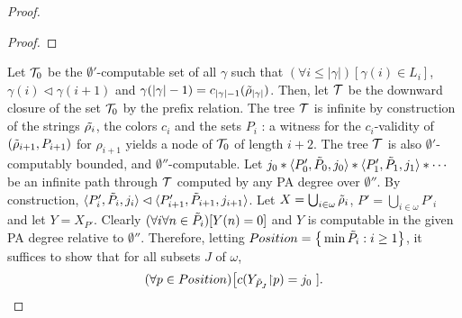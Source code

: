 \begin{proof}
\begin{proof}
\end{proof}

Let $\mathcal{T}_0$ be the $\emptyset'$-computable set of all $\gamma$ such that
$(\forall i\leq |\gamma|)[\gamma(i)\in L_i]$,
$\gamma(i) \lhd \gamma(i+1)$ and $\gamma(|\gamma|-1) = c_{|\gamma|-1}(\tilde{\rho}_{|\gamma|})$.
Then, let $\mathcal{T}$ be the downward closure of the set $\mathcal{T}_0$
by the prefix relation. The tree $\mathcal{T}$ is infinite by construction of the strings $\tilde{\rho_i}$, the colors $c_i$ and the sets $P_i$ : a witness for the $c_i$-validity of $(\tilde{\rho}_{i+1}, P_{i+1})$ for $\rho_{i+1}$ yields a node of $\mathcal{T}_0$ of length $i+2$. The tree $\mathcal{T}$ is also $\emptyset'$-computably bounded, and $\emptyset''$-computable.
Let $j_0*\langle P'_0,\tilde{P}_0,j_0\rangle *\langle P'_1,\tilde{P}_1,j_1\rangle *\cdots$
be an infinite path through $\mathcal{T}$ computed by any PA degree over $\emptyset''$.
By construction, $\langle P'_i,\tilde{P}_i,j_i\rangle \lhd \langle P'_{i+1},\tilde{P}_{i+1},j_{i+1} \rangle$.
Let $X = \bigcup_{i\in\omega}\tilde{\rho}_i$,
$P' = \bigcup_{i\in\omega} P'_i$
and let $Y = X_{P'}$.
Clearly  $(\forall i \forall n\in \tilde{P}_i)[Y(n) = 0]$
and $Y$ is computable in the given PA degree relative to $\emptyset''$.
Therefore,
letting $Position = \big\{\min \tilde{P}_i : i \geq 1\big\}$, it suffices
to show that
for all subsets $J$ of $\omega$,
$$
(\forall p\in Position)\big[
c(Y_{\tilde{P}_J}{\upharpoonright} p) = j_0\ ].
$$


\end{proof}
